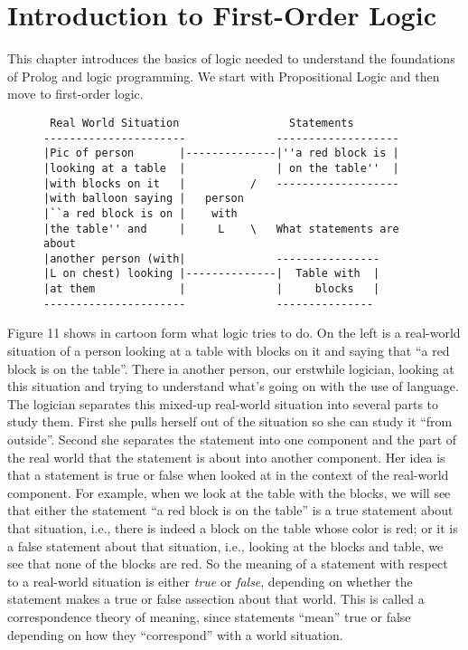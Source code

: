 \chapter{Introduction to First-Order Logic} \label{fol}

This chapter introduces the basics of logic needed to understand the
foundations of Prolog and logic programming.  We start with
Propositional Logic and then move to first-order logic.

\begin{figure}
\begin{verbatim}
 Real World Situation                 Statements
----------------------              -------------------
|Pic of person       |--------------|''a red block is |
|looking at a table  |              | on the table''  |
|with blocks on it   |          /   -------------------
|with balloon saying |   person
|``a red block is on |    with
|the table'' and     |     L    \   What statements are about
|another person (with|              ----------------
|L on chest) looking |--------------|  Table with  |
|at them             |              |     blocks   |
----------------------              ---------------
\end{verbatim}
\end{figure}

Figure 11 shows in cartoon form what logic tries to do.  On the left
is a real-world situation of a person looking at a table with blocks
on it and saying that ``a red block is on the table''.  There ia
another person, our erstwhile logician, looking at this situation and
trying to understand what's going on with the use of language.  The
logician separates this mixed-up real-world situation into several
parts to study them.  First she pulls herself out of the situation so
she can study it ``from outside''.  Second she separates the statement
into one component and the part of the real world that the statement
is about into another component.  Her idea is that a statement is true
or false when looked at in the context of the real-world component.
For example, when we look at the table with the blocks, we will see
that either the statement ``a red block is on the table'' is a true
statement about that situation, i.e., there is indeed a block on the
table whose color is red; or it is a false statement about that
situation, i.e., looking at the blocks and table, we see that none of
the blocks are red.  So the meaning of a statement with respect to a
real-world situation is either {\em true} or {\em false}, depending on
whether the statement makes a true or false assection about that
world.  This is called a correspondence theory of meaning, since
statements ``mean'' true or false depending on how they ``correspond''
with a world situation.

